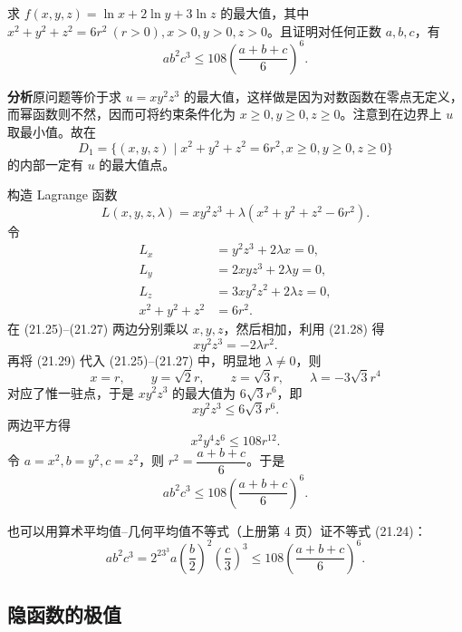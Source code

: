 \begin{xexample}[21.4.4]
求 $f(x,y,z)=\ln x+2\ln y+3\ln z$ 的最大值，其中 $x^2+y^2+z^2=6r^2\ (r>0),x>0,y>0,z>0$。且证明对任何正数 $a,b,c$，有
\begin{equation}
  ab^2c^3\le108\left(\frac{a+b+c}{6}\right)^6.
  \tag{21.24}
  \label{eq:21.24}
\end{equation}
\end{xexample}
\begin{xsolution}
\textbf{分析}\quad 原问题等价于求 $u=xy^2z^3$ 的最大值，这样做是因为对数函数在零点无定义，而幂函数则不然，因而可将约束条件化为 $x\ge0,y\ge0,z\ge0$。注意到在边界上 $u$ 取最小值。故在
\[
  D_1=\{(x,y,z)\mid x^2+y^2+z^2=6r^2,x\ge0,y\ge0,z\ge0\}
\]
的内部一定有 $u$ 的最大值点。

构造 Lagrange 函数
\[
  L(x,y,z,\lambda)=xy^2z^3+\lambda(x^2+y^2+z^2-6r^2).
\]
令
\begin{align}
  L_x&=y^2z^3+2\lambda x=0, \tag{21.25}\label{eq:21.25}\\
  L_y&=2xyz^3+2\lambda y=0, \tag{21.26}\label{eq:21.26}\\
  L_z&=3xy^2z^2+2\lambda z=0, \tag{21.27}\label{eq:21.27}\\
  x^2+y^2+z^2&=6r^2. \tag{21.28}\label{eq:21.28}
\end{align}
在 (21.25)--(21.27) 两边分别乘以 $x,y,z$，然后相加，利用 (21.28) 得
\begin{equation}
  xy^2z^3=-2\lambda r^2.
  \tag{21.29}
  \label{eq:21.29}
\end{equation}
再将 (21.29) 代入 (21.25)--(21.27) 中，明显地 $\lambda\ne0$，则
\[
  x=r,\qquad y=\sqrt2r,\qquad z=\sqrt3r,
  \qquad \lambda=-3\sqrt3r^4
\]
对应了惟一驻点，于是 $xy^2z^3$ 的最大值为 $6\sqrt3r^6$，即
\[
  xy^2z^3\le6\sqrt3r^6.
\]
两边平方得
\[
  x^2y^4z^6\le108r^{12}.
\]
令 $a=x^2,b=y^2,c=z^2$，则 $r^2=\dfrac{a+b+c}{6}$。于是
\[
  ab^2c^3\le108\left(\frac{a+b+c}{6}\right)^6.
\]
\end{xsolution}
\begin{xremark}
也可以用算术平均值--几何平均值不等式（上册第 4 页）证不等式 (21.24)：
\begin{equation}
  ab^2c^3=2^23^3a\left(\frac b2\right)^2\left(\frac c3\right)^3
  \le108\left(\frac{a+b+c}{6}\right)^6.
  \tag{21.30}
  \label{eq:21.30}
\end{equation}
\end{xremark}

\subsection{隐函数的极值}

